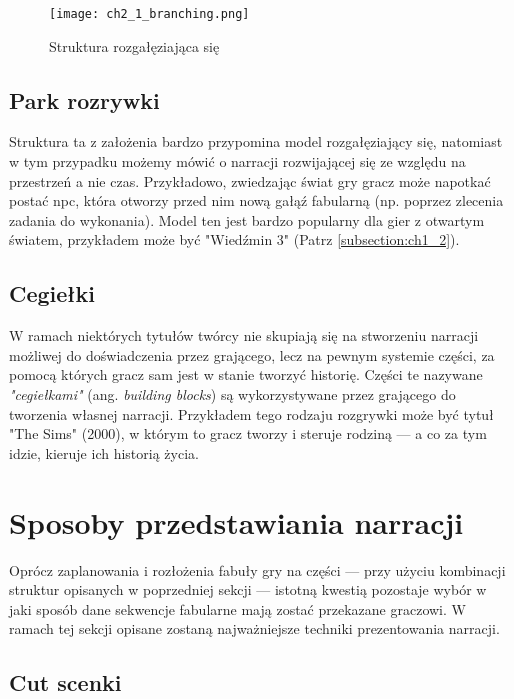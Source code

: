 \begin{figure}[h]
    \texttt{[image: ch2\_1\_branching.png]}
    \caption{Struktura rozgałęziająca się}
    \centering
    \label{fig:ch1_2_1_branching}
\end{figure}

\newpage

\subsection{Park rozrywki}

Struktura ta z założenia bardzo przypomina model rozgałęziający się, natomiast w tym przypadku
możemy mówić o narracji rozwijającej się ze względu na przestrzeń a nie czas\cite{theorising_narrative}.
Przykładowo, zwiedzając świat gry gracz może napotkać postać \gls{npc}, która otworzy przed nim nową
gałąź fabularną (np. poprzez zlecenia zadania do wykonania)\cite{the_evolution_of_video_games}.
Model ten jest bardzo popularny dla gier z otwartym światem, przykładem może być "Wiedźmin 3"
(Patrz \ref{subsection:ch1_2}).

\subsection{Cegiełki}

W ramach niektórych tytułów twórcy nie skupiają się na stworzeniu narracji możliwej do doświadczenia
przez grającego, lecz na pewnym systemie części, za pomocą których gracz sam jest w stanie tworzyć
historię. Części te nazywane \textit{"cegiełkami"} (ang. \textit{building blocks})\cite{theorising_narrative}
są wykorzystywane przez grającego do tworzenia własnej narracji. Przykładem tego rodzaju rozgrywki
może być tytuł "The Sims" (2000), w którym to gracz tworzy i steruje rodziną --- a co za tym idzie,
kieruje ich historią życia.

\section{Sposoby przedstawiania narracji}\label{subsection:ch1_2_2}

Oprócz zaplanowania i rozłożenia fabuły gry na części --- przy użyciu kombinacji struktur opisanych
w poprzedniej sekcji --- istotną kwestią pozostaje wybór w jaki sposób dane sekwencje fabularne
mają zostać przekazane graczowi. W ramach tej sekcji opisane zostaną najważniejsze techniki
prezentowania narracji.

\subsection{Cut scenki}\label{subsubsection:ch1_2_2_cutscene}

